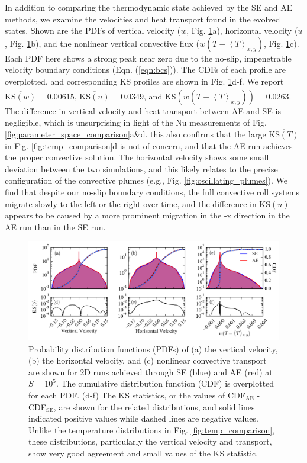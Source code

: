 \documentclass[aps, pre, onecolumn, nofootinbib, notitlepage, groupedaddress, amsfonts, amssymb, amsmath, longbibliography]{revtex4-1}
\newcommand{\angles}[1]{\ensuremath{\left\langle #1 \right\rangle}}
\newcommand{\KS}[1]{\ensuremath{\text{KS}(#1)}}
\newcommand{\KSstat}[1]{\ensuremath{\overline{\text{KS}(#1)}}}
\begin{document}
In addition to comparing the thermodynamic state achieved by the SE and AE methods,
we examine the velocities and heat transport found in the evolved states.
Shown are the PDFs of 
vertical velocity ($w$, Fig. \ref{fig:pdf_comparison}a), horizontal velocity ($u$, Fig. \ref{fig:pdf_comparison}b),
and the nonlinear vertical convective flux ($w(T - \angles{T}_{x,y})$, Fig. \ref{fig:pdf_comparison}c). 
Each PDF here shows a strong peak near zero due to the no-slip, impenetrable
velocity boundary conditions (Eqn. (\ref{eqn:bcs})).
The CDFs of each profile are overplotted, and corresponding KS profiles are
shown in Fig. \ref{fig:pdf_comparison}d-f.  We report
$\KSstat{w} = 0.00615$, $\KSstat{u} = 0.0349$,
and $\KSstat{w(T - \angles{T}_{x,y})} = 0.0263$.
The difference in vertical velocity
and heat transport between AE and SE is negligible, which is unsurprising in light of
the Nu measurements of Fig. \ref{fig:parameter_space_comparison}a\&d.
this also confirms that the large $\KSstat{T}$ in Fig. \ref{fig:temp_comparison}d is
not of concern, and that the AE run achieves the proper convective solution.
The horizontal velocity shows some small deviation between the two simulations, and this
likely relates to the precise configuration of the convective plumes (e.g., Fig. \ref{fig:oscillating_plumes}).
We find that despite our no-slip boundary conditions, the full convective roll systems
migrate slowly to the left or the right over time, and the difference in $\KS{u}$
appears to be caused by a more prominent migration in the -x direction in the AE run
than in the SE run.


\begin{figure}[t]
\includegraphics[width=\textwidth]{./figs/pdf_comparison.png}
\caption{Probability distribution functions (PDFs) of (a) the vertical velocity, (b) the horizontal velocity, and (c) nonlinear
convective transport are shown for 2D runs achieved through SE (blue) and AE (red)
at $S = 10^{5}$.  The cumulative distribution function (CDF) is overplotted for each PDF. 
(d-f) The KS statistics, or the values of CDF$_{\text{AE}}$ - CDF$_{\text{SE}}$,
are shown for the related distributions, and solid lines indicated positive values
while dashed lines are negative values. Unlike the temperature distributions in
Fig. \ref{fig:temp_comparison}, these distributions, particularly the vertical
velocity and transport, show very good agreement and small values of the KS statistic.
\label{fig:pdf_comparison} }
\end{figure}
\end{document}
